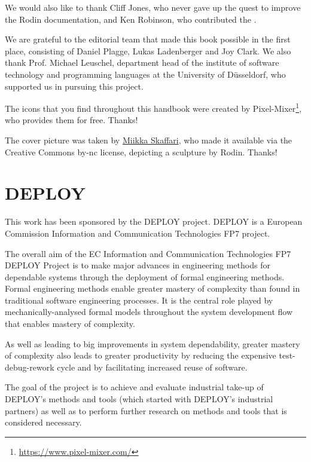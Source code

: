 \documentclass[twoside,10pt]{book}
\begin{document}
We would also like to thank Cliff Jones, who never gave up the quest to improve the Rodin documentation, and Ken Robinson, who contributed the .

We are grateful to the editorial team that made this book possible in the first place, consisting of Daniel Plagge, Lukas Ladenberger and Joy Clark.  We also thank Prof. Michael Leuschel, department head of the institute of software technology and programming languages at the University of Düsseldorf, who supported us in pursuing this project.

The icons that you find throughout this handbook were created by Pixel-Mixer\footnote{\url{https://www.pixel-mixer.com/}}, who provides them for free.  Thanks!

The cover picture was taken by \href{https://www.skaffari.fi/}{Miikka Skaffari}, who made it available via the Creative Commons by-nc license, depicting a sculpture by Rodin.  Thanks!

\section{DEPLOY}
\label{deploy}

This work has been sponsored by the DEPLOY project.  DEPLOY is a European Commission Information and Communication Technologies FP7 project.

The overall aim of the EC Information and Communication Technologies FP7 DEPLOY Project is to make major advances in engineering methods for dependable systems through the deployment of formal engineering methods. Formal engineering methods enable greater mastery of complexity than found in traditional software engineering processes. It is the central role played by mechanically-analysed formal models throughout the system development flow that enables mastery of complexity.

As well as leading to big improvements in system dependability, greater mastery of complexity also leads to greater productivity by reducing the expensive test-debug-rework cycle and by facilitating increased reuse of software.

The goal of the project is to achieve and evaluate industrial take-up of DEPLOY's methods and tools (which started with DEPLOY's industrial partners) as well as to perform further research on methods and tools that is considered necessary.



% 







\clearpage
{}
{} 
\printindex
\end{document}
